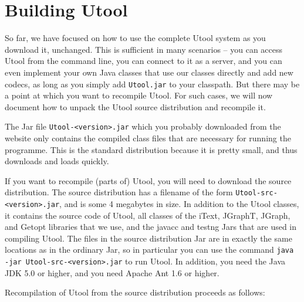 
\section{Building Utool} \label{sec:building}

So far, we have focused on how to use the complete Utool system as you
download it, unchanged. This is sufficient in many scenarios -- you
can access Utool from the command line, you can connect to it as a
server, and you can even implement your own Java classes that use our
classes directly and add new codecs, as long as you simply add \verb?Utool.jar? 
to your
classpath. But there may be a point at which you want to recompile
Utool. For such cases, we will now document how to unpack the Utool
source distribution and recompile it.

The Jar file \verb?Utool-<version>.jar? which you probably downloaded
from the website only contains the compiled class files that are
necessary for running the programme. This is the standard distribution
because it is pretty small, and thus downloads and loads quickly.

If you want to recompile (parts of) Utool, you will need to download
the source distribution. The source distribution has a filename of the
form \verb?Utool-src-<version>.jar?, and is some 4 megabytes in
size. In addition to the Utool classes, it contains the source code of
Utool, all classes of the iText, JGraphT, JGraph, and Getopt libraries
that we use, and the javacc and testng Jars that are used in compiling
Utool. The files in the source distribution Jar are in exactly the
same locations as in the ordinary Jar, so in particular you can use
the command \verb?java -jar Utool-src-<version>.jar? to run Utool. In
addition, you need the Java JDK 5.0 or higher, and you need Apache Ant
1.6 or higher.

Recompilation of Utool from the source distribution proceeds as
follows:

